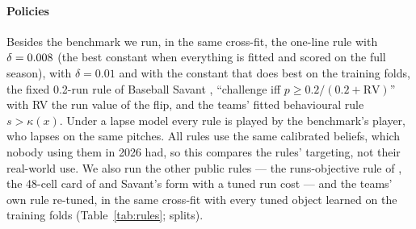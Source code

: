 \documentclass[aoas]{imsart}
\theoremstyle{plain}
\theoremstyle{definition}
\begin{document}
\paragraph{Policies} Besides the benchmark we run, in the same cross-fit, the one-line rule with $\delta=0.008$ (the best constant when everything is fitted and scored on the full
season), with $\delta=0.01$ and with the constant that does best on the training folds, the fixed
0.2-run rule of Baseball Savant \citep{Savant2026abs}, ``challenge iff $p\ge0.2/(0.2+\mathrm{RV})$'' with RV the run
value of the flip, and the teams' fitted behavioural rule $s>\kappa(x)$. Under a lapse model every rule is played by the
benchmark's player, who lapses on the same pitches. All rules use the same calibrated beliefs, which nobody using them
in 2026 had, so this compares the rules' targeting, not their real-world use. We also run the other public rules --- the runs-objective rule of \citet{Namuduri2026runs}, the 48-cell card of
\citet{Arora2026use} and Savant's form with a tuned run cost --- and the teams' own rule re-tuned, in the same cross-fit
with every tuned object learned on the training folds (Table~\ref{tab:rules}; \GapExtS{} splits).

\begin{table}[t]
\caption{Benchmark and observed play, wins per team-season (sum of WP increments), full policy cross-fit, primary
intervention, with 95\% intervals from the bootstrap that refits the whole procedure ($B=\GapB$ for each model): percentile for the wins, normal for the index, whose bootstrap location is shifted (Section~\ref{sec:eval}). Challenges per team-game. The observed value differs in the third decimal between the models because the
scoring engines depend on the random splits.}\label{tab:policies}
\centering\small

\end{table}

\begin{table}[t]
\caption{Rules a team could implement, on the same worlds as Table~\ref{tab:policies}: the share of the gap between the
observed challenges and the benchmark that the rule recovers, in percent (95\% bootstrap percentile intervals where the rule was in the bootstrap), and challenges per
team-game (Chall.). A negative share means the rule earns less than the teams did. Every tuned object (constants, run
cost, card thresholds, re-tuned criteria) is learned on the training folds.}\label{tab:rules}
\centering\small

\end{table}
\end{document}

